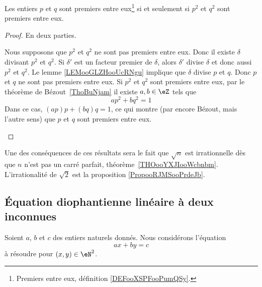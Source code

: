 \begin{proposition}     \label{PROPooRZDDooLJabov}
	Les entiers \( p\) et \( q\) sont premiers entre eux\footnote{Premiers entre eux, définition \ref{DEFooXSPFooPumQSy}.} si et seulement si \( p^2\) et \( q^2\) sont premiers entre eux.
\end{proposition}

\begin{proof}
	En deux parties.
	\begin{subproof}
		\spitem[\( \Rightarrow\)]
		Nous supposons que \( p^2\) et \( q^2\) ne sont pas premiers entre eux. Donc il existe \( \delta\) divisant \( p^2\) et \( q^2\). Si \( \delta'\) est un facteur premier de \( \delta\), alors \( \delta'\) divise \( \delta\) et donc aussi \( p^2\) et \( q^2\). Le lemme \ref{LEMooGLZHooUcRNgu} implique que \( \delta\) divise \( p\) et \( q\). Donc \( p\) et \( q\) ne sont pas premiers entre eux.
		\spitem[\( \Leftarrow\)]
		Si \( p^2\) et \( q^2\) sont premiers entre eux, par le théorème de Bézout~\ref{ThoBuNjam} il existe \( a,b\in \eZ\) tels que
		\begin{equation}
			ap^2+bq^2=1
		\end{equation}
		Dans ce cas, \( (ap)p+(bq)q=1\), ce qui montre (par encore Bézout, mais l'autre sens) que \( p\) et \( q\) sont premiers entre eux.
	\end{subproof}
\end{proof}


Une des conséquences de ces résultats sera le fait que \( \sqrt{n}\) est irrationnelle dès que \( n\) n'est pas un carré parfait, théorème~\ref{THOooYXJIooWcbnbm}. L'irrationalité de \( \sqrt{2}\) est la proposition \ref{PropooRJMSooPrdeJb}.
\subsection{Équation diophantienne linéaire à deux inconnues}
\label{subsecZVKNooXNjPSf}


Soient \( a\), \( b\) et \( c\) des entiers naturels donnés. Nous considérons l'équation
\begin{equation}        \label{EqTOVSooJbxlIq}
	ax+by=c
\end{equation}
à résoudre\cite{PAYUooYVuNAB} pour \( (x,y)\in \eN^2\).

